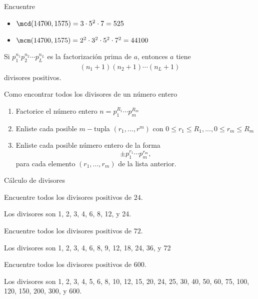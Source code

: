 {}
Encuentre
\begin{itemize}
	\item $\mcd(14700,1575) = 3 \cdot 5^{2} \cdot 7=525$ 
	\item $\mcm(14700,1575) = 2^{2} \cdot 3^{2} \cdot 5^{2} \cdot 7^{2}= 44100$
\end{itemize}


{}
	\begin{proposicion}
		Si $p_{1}^{n_{1}}p_{2}^{n_{2}}\cdots p_{L}^{n_{L}}$ es la factorización prima de $a$, entonces $a$ tiene \begin{align*}
			\left( n_{1}+1 \right)\left( n_{2}+1 \right)\cdots\left( n_{L}+1 \right)
		\end{align*} divisores positivos.
		
	\end{proposicion}
	



	\begin{algoritmo}{Como encontrar todos los divisores de un número entero}
		\begin{enumerate}
			\item Factorice el número entero
			$n=p_{1}^{R_{1}}\cdots p_{m}^{R_{m}}$
			\item Enliste cada posible $m-$tupla
			$\left( r_{1},...,r^{m} \right)$
			con $0\leq r_{1}\leq R_{1},...,0\leq r_{m}\leq R_{m}$
			\item Enliste cada posible número entero de la forma $$\pm p_{1}^{r_{1}}\cdots p_{m}^{r_{m}},$$ para cada elemento $\left( r_{1},...,r_{m} \right)$ de la lista anterior.
		\end{enumerate}
	\end{algoritmo}
	



{Cálculo de divisores}
	\begin{problema}
		Encuentre todos los divisores positivos de $24$.
	\end{problema}
	
	Los divisores son 1, 2, 3, 4, 6, 8, 12, y 24.
	

{}
	\begin{problema}
		Encuentre todos los divisores positivos de $72$.
	\end{problema}
	
	Los divisores son 1, 2, 3, 4, 6, 8, 9, 12, 18, 24, 36, y 72
	

{}
	\begin{problema}
		Encuentre todos los divisores positivos de $600$.
	\end{problema}
	
	Los divisores son 1, 2, 3, 4, 5, 6, 8, 10, 12, 15, 20, 24, 25, 30, 40, 50, 60, 75, 100, 120, 150, 200, 300, y 600.


